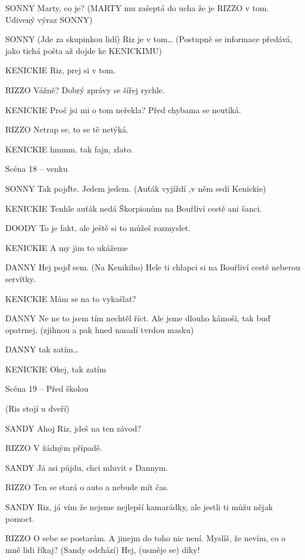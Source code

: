 SONNY        Marty, co je? (MARTY mu zašeptá do ucha že je RIZZO v tom. Udivený         výraz SONNY) 

SONNY        (Jde za skupinkou lidí) Riz je v tom… (Postupně se informace předává,         jako tichá pošta až dojde ke KENICKIMU)

KENICKIE        Riz, prej si v tom.

RIZZO        Vážně? Dobrý zprávy se šířej rychle.

KENICKIE        Proč jsi mi o tom neřekla? Před chybama se neutíká.

RIZZO        Netrap se, to se tě netýká. 

KENICKIE        hmmm, tak fajn, zlato. 





Scéna 18  – venku

SONNY        Tak pojďte. Jedem jedem. (Auťák vyjíždí ,v něm sedí Kenickie)

KENICKIE        Tenhle auťák nedá Škorpionům na Bouřliví cestě ani šanci.

DOODY        To je fakt, ale ještě si to můžeš rozmyslet.  

KENICKIE        A my jim to ukážeme

DANNY        Hej pojď sem. (Na Kenikiho) Hele ti chlapci si na Bouřliví cestě neberou         servítky.

KENICKIE        Mám se na to vykašlat?

DANNY        Ne ne to jsem tím nechtěl říct. Ale jsme dlouho kámoši, tak buď opatrnej, (zjihnou a pak hned nasadí tvrdou masku)

DANNY        tak zatím…

KENICKIE        Okej, tak zatím 





Scéna 19 – Před školou 

(Ris stojí u dveří)

SANDY        Ahoj Riz, jdeš na ten závod?

RIZZO        V žádným případě.

SANDY        Já asi půjdu, chci mluvit s Dannym.

RIZZO        Ten se stará o auto a nebude mít čas. 

SANDY        Riz, já vím že nejsme nejlepší kamarádky, ale jestli ti můžu nějak                 pomoct.

RIZZO        O sebe se postarám. A jinejm do toho nic není. Myslíš, že nevím, co o         mně lidi říkaj? (Sandy odchází) Hej, (usměje se) díky! 


